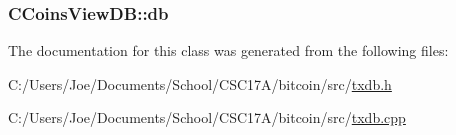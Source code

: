 \subsubsection[{db}]{ C\+Coins\+View\+D\+B\+::db\hspace{0.3cm}{\ttfamily [protected]}}\label{class_c_coins_view_d_b_aba0a7b26fe82c1a2e80ca060d12fb66a}


The documentation for this class was generated from the following files\+:\begin{DoxyCompactItemize}
\item 
C\+:/\+Users/\+Joe/\+Documents/\+School/\+C\+S\+C17\+A/bitcoin/src/\hyperlink{txdb_8h}{txdb.\+h}\item 
C\+:/\+Users/\+Joe/\+Documents/\+School/\+C\+S\+C17\+A/bitcoin/src/\hyperlink{txdb_8cpp}{txdb.\+cpp}\end{DoxyCompactItemize}
